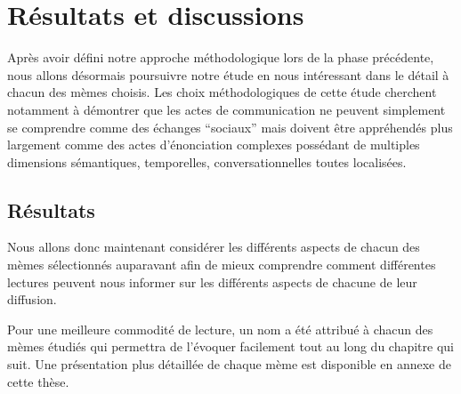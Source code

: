 \chapter{R\'esultats et discussions}

Apr\`es avoir d\'efini notre approche m\'ethodologique lors de la phase pr\'ec\'edente, nous allons d\'esormais poursuivre notre \'etude en nous int\'eressant dans le d\'etail \`a chacun des m\`emes choisis. Les choix m\'ethodologiques de cette \'etude cherchent notamment \`a d\'emontrer que les actes de communication ne peuvent simplement se comprendre comme des \'echanges {\textquotedblleft}sociaux{\textquotedblright} mais doivent \^etre appr\'ehend\'es plus largement comme des actes d{\textquoteright}\'enonciation complexes poss\'edant de multiples dimensions s\'emantiques, temporelles, conversationnelles toutes localis\'ees. 

\section{R\'esultats}
Nous allons donc maintenant consid\'erer les diff\'erents aspects de chacun des m\`emes s\'electionn\'es auparavant afin de mieux comprendre comment diff\'erentes lectures peuvent nous informer sur les diff\'erents aspects de chacune de leur diffusion. 

Pour une meilleure commodit\'e de lecture, un nom a \'et\'e attribu\'e \`a chacun des m\`emes \'etudi\'es qui permettra de l{\textquoteright}\'evoquer facilement tout au long du chapitre qui suit. Une pr\'esentation plus d\'etaill\'ee de chaque m\`eme est disponible en annexe de cette th\`ese. 

